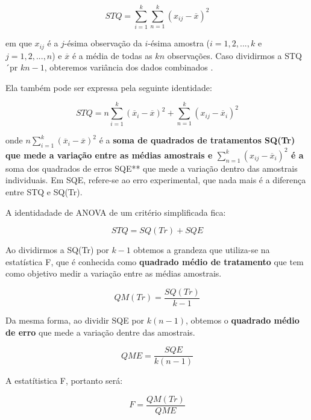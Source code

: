 \documentclass[
  openany]{book}
\begin{document}
\begin{equation} 
STQ= \displaystyle \sum^k_{i=1} \displaystyle \sum^k_{n=1}(x_{ij}-\overline{x})^2
  \label{eq:sqtanova}
\end{equation}

em que \(x_{ij}\) é a \(j\)-ésima observação da \(i\)-ésima amostra (\(i=1,2,...,k\) e \(j=1,2,...,n\)) e \(\overline{x}\) é a média de todas as \(kn\) observações. Caso dividirmos a STQ ´pr \(kn-1\), obteremos variância dos dados combinados \citep{freund2009estatistica}.

Ela também pode ser expressa pela seguinte identidade:

\begin{equation} 
STQ= n \displaystyle \sum^k_{i=1} (\overline{x}_i-\overline{x})^2+ \displaystyle \sum^k_{n=1}(x_{ij}-\overline{x}_i)^2
  \label{eq:sqtanova2}
\end{equation}

onde \(n \displaystyle \sum^k_{i=1} (\overline{x}_i-\overline{x})^2\) é a \textbf{soma de quadrados de tratamentos SQ(Tr) que mede a variação entre as médias amostrais e \(\displaystyle \sum^k_{n=1}(x_{ij}-\overline{x}_i)^2\) é a} soma dos quadrados de erros SQE** que mede a variação dentro das amostrais individuais. Em SQE, refere-se ao erro experimental, que nada mais é a diferença entre STQ e SQ(Tr).

A identidadade de ANOVA de um critério simplificada fica:

\begin{equation} 
STQ= SQ(Tr)+SQE
  \label{eq:sqtanova3}
\end{equation}

Ao dividirmos a SQ(Tr) por \(k-1\) obtemos a grandeza que utiliza-se na estatística F, que é conhecida como \textbf{quadrado médio de tratamento} que tem como objetivo medir a variação entre as médias amostrais.

\begin{equation} 
QM(Tr)=\frac{SQ(Tr)}{k-1}
  \label{eq:qmtr1}
\end{equation}

Da mesma forma, ao dividir SQE por \(k(n-1)\), obtemos o \textbf{quadrado médio de erro} que mede a variação dentre das amostrais.

\begin{equation} 
QME=\frac{SQE}{k(n-1)}
  \label{eq:qme1}
\end{equation}

A estatítistica F, portanto será:

\begin{equation} 
F=\frac{QM(Tr)}{QME}
  \label{eq:fanova}
\end{equation}
\end{document}
